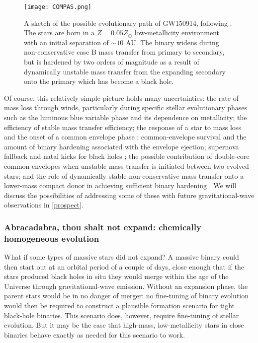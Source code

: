\documentclass[iop,onecolumn]{revtex4}
\begin{document}
\begin{figure}
	\centering
	\texttt{[image: COMPAS.png]}
	\caption{\label{fig:COMPAS} A sketch of the possible evolutionary path of GW150914, following \citet{Stevenson:2017}.  The stars are born in a $Z=0.05 Z_\odot$ low-metallicity environment with an initial separation of $\sim 10$ AU.  The binary widens during non-conservative case B mass transfer from primary to secondary, but is hardened by two orders of magnitude as a result of dynamically unstable mass transfer from the expanding secondary onto the primary which has become a black hole.}
\end{figure}

Of course, this relatively simple picture holds many uncertainties: the rate of mass loss through winds, particularly during specific stellar evolutionary phases such as the luminous blue variable phase \citep{Mennekens:2014} and its dependence on metallicity; the efficiency of stable mass transfer efficiency; the response of a star to mass loss and the onset of a common envelope phase \citep{Pavlovskii:2017}; common-envelope survival and the amount of binary hardening associated with the envelope ejection; supernova fallback and natal kicks for black holes \citep[e.g.,][]{Repetto:2012,Mandel:2015kicks}; the possible contribution of double-core common envelopes when unstable mass transfer is initiated between two evolved stars; and the role of dynamically stable non-conservative mass transfer onto a lower-mass compact donor in achieving sufficient binary hardening  \citep{vandenHeuvel:2017,Neijssel:2018}.  We will discuss the possibilities of addressing some of these with future gravitational-wave observations in \autoref{prospect}.

\subsubsection{Abracadabra, thou shalt not expand: chemically homogeneous evolution}

What if some types of massive stars did not expand? A massive binary could then start out at an orbital period of a couple of days, close enough that if the stars produced black holes in situ they would merge within the age of the Universe through gravitational-wave emission. Without an expansion phase, the parent stars would be in no danger of merger: no fine-tuning of binary evolution would then be required to construct a plausible formation scenario for tight black-hole binaries. This scenario does, however, require fine-tuning of stellar evolution. But it may be the case that high-mass, low-metallicity stars in close binaries behave exactly as needed for this scenario to work.
\end{document}
